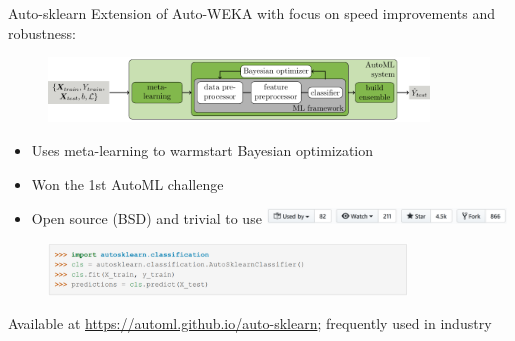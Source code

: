 
\begin{frame}[c]{Auto-sklearn }
Extension of Auto-WEKA with focus on speed improvements and robustness:
\begin{figure}
    \centering
    \includegraphics[width=0.9\textwidth]{images/success_stories/automlworkflow.pdf}
\end{figure}
\begin{itemize}
    \item Uses meta-learning to warmstart Bayesian optimization
    \item Won the 1st AutoML challenge
\pause
    \item Open source (BSD) and trivial to use \includegraphics[width=0.5\textwidth]{images/success_stories/auto-sklearn-repo-stats.png}
\end{itemize}
\begin{figure}
    \centering
    \includegraphics[width=0.85\textwidth]{images/success_stories/Auto-sklearn_01.png}
\end{figure}
\vspace*{-0.1cm}
Available at \url{https://automl.github.io/auto-sklearn}; frequently used in industry

\end{frame}

